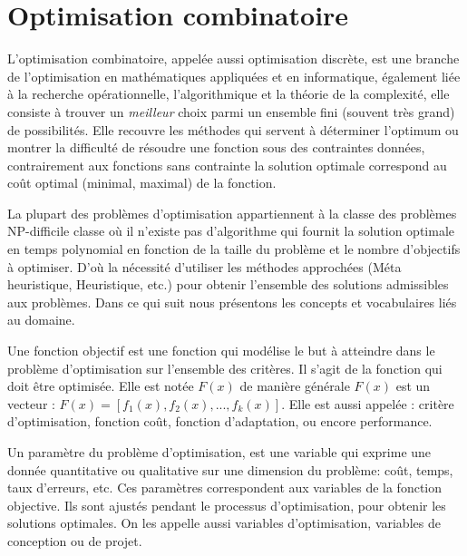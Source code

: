 
\section{Optimisation combinatoire}
	L'optimisation combinatoire, appelée  aussi optimisation discrète, est une branche de l'optimisation en mathématiques appliquées et en informatique, également liée à la recherche opérationnelle, l'algorithmique et la théorie de la complexité, elle consiste à trouver un \emph{meilleur} choix parmi un ensemble fini (souvent très grand) de possibilités. Elle recouvre les méthodes qui servent à déterminer l'optimum ou montrer la difficulté de résoudre une fonction sous des contraintes données, contrairement aux fonctions sans contrainte la solution optimale correspond au coût optimal (minimal, maximal) de la fonction.

	La plupart des problèmes d'optimisation appartiennent à la classe des problèmes NP-difficile classe où il n'existe pas d'algorithme qui fournit la solution optimale en temps polynomial en fonction de la taille du problème et le nombre d'objectifs à optimiser. D'où la nécessité d'utiliser les méthodes approchées (Méta heuristique, Heuristique, etc.) pour obtenir l'ensemble des solutions admissibles aux problèmes.
 Dans ce qui suit nous présentons les concepts et vocabulaires liés au domaine.


\begin{definition}
	Une fonction objectif est une fonction qui modélise le but à atteindre dans le problème d'optimisation sur l'ensemble des critères. Il s'agit de la fonction qui doit être optimisée. Elle est notée $F(x)$ de manière générale $F(x)$ est un vecteur :
$F(x)= [f_1(x), f_2(x),..., f_k(x)]$. Elle est aussi appelée : critère d'optimisation, fonction coût, fonction d'adaptation, ou encore performance.
\end{definition}

\begin{definition}[Paramètres]
	Un paramètre du problème d'optimisation, est une variable qui exprime une donnée quantitative ou qualitative sur une dimension du problème: coût, temps, taux d'erreurs, etc. Ces paramètres correspondent aux variables de la fonction objective. Ils sont ajustés pendant le processus d'optimisation, pour obtenir les solutions optimales. On les appelle aussi variables d'optimisation, variables de conception ou de projet.
\end{definition}

